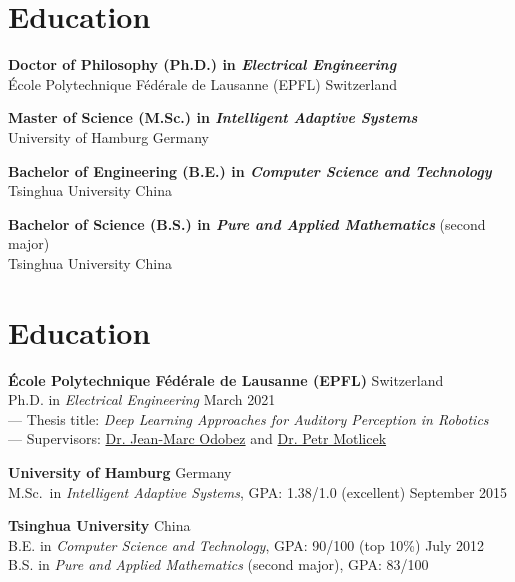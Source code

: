 \documentclass[a4paper,9pt]{extarticle} %
\newcommand{\ind}{\hspace*{1em}}
\begin{document}
\section{Education}
\parbox{\textwidth}{%
\textbf{Doctor of Philosophy (Ph.D.) in \textit{Electrical Engineering}} \\
\ind{} \'Ecole Polytechnique F\'ed\'erale de Lausanne (EPFL) \hfill Switzerland
}

\parbox{\textwidth}{%
\textbf{Master of Science (M.Sc.) in \textit{Intelligent Adaptive Systems}} \\
\ind{} University of Hamburg \hfill Germany
}

\parbox{\textwidth}{%
\textbf{Bachelor of Engineering (B.E.) in \textit{Computer Science and Technology}} \\
\ind{} Tsinghua University \hfill China
}

\parbox{\textwidth}{%
\textbf{Bachelor of Science (B.S.) in \textit{Pure and Applied Mathematics}} (second major) \\
\ind{} Tsinghua University \hfill China
}

\iffalse{}


\section{Education}
\parbox{\textwidth}{%
\textbf{\'Ecole Polytechnique F\'ed\'erale de Lausanne (EPFL)} \hfill Switzerland \\
\ind{} Ph.D. in \textit{Electrical Engineering} \hfill March 2021 \\
\ind{} --- Thesis title: \textit{Deep Learning Approaches for Auditory Perception in Robotics} \\
\ind{} --- Supervisors: \href{https://idiap.ch/~odobez}{Dr. Jean-Marc Odobez} and \href{https://people.idiap.ch/pmotlic}{Dr. Petr Motlicek}
}

\parbox{\textwidth}{%
\textbf{University of Hamburg} \hfill Germany \\
\ind{} M.Sc.\ in \textit{Intelligent Adaptive Systems}, GPA\@: 1.38/1.0 (excellent)  \hfill September 2015%
}

\parbox{\textwidth}{%
\textbf{Tsinghua University} \hfill China \\
\ind{} B.E. in \textit{Computer Science and Technology}, GPA\@: 90/100 (top 10\%) \hfill July 2012 \\
\ind{} B.S. in \textit{Pure and Applied Mathematics} (second major), GPA\@: 83/100 %
}
\end{document}
